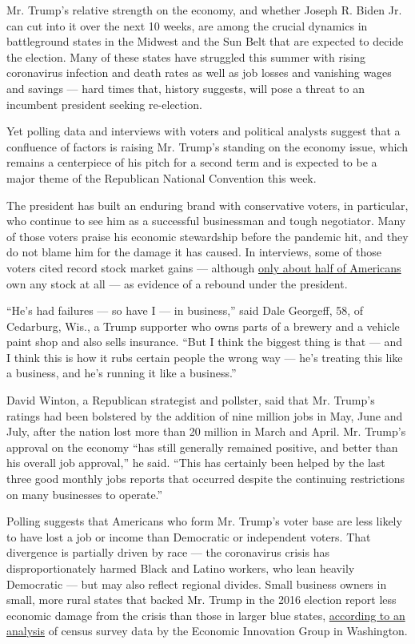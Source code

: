 Mr. Trump's relative strength on the economy, and whether Joseph R.
Biden Jr. can cut into it over the next 10 weeks, are among the crucial
dynamics in battleground states in the Midwest and the Sun Belt that are
expected to decide the election. Many of these states have struggled
this summer with rising coronavirus infection and death rates as well as
job losses and vanishing wages and savings --- hard times that, history
suggests, will pose a threat to an incumbent president seeking
re-election.

Yet polling data and interviews with voters and political analysts
suggest that a confluence of factors is raising Mr. Trump's standing on
the economy issue, which remains a centerpiece of his pitch for a second
term and is expected to be a major theme of the Republican National
Convention this week.

The president has built an enduring brand with conservative voters, in
particular, who continue to see him as a successful businessman and
tough negotiator. Many of those voters praise his economic stewardship
before the pandemic hit, and they do not blame him for the damage it has
caused. In interviews, some of those voters cited record stock market
gains --- although \href{https://www.nber.org/papers/w24085}{only about
half of Americans} own any stock at all --- as evidence of a rebound
under the president.

``He's had failures --- so have I --- in business,'' said Dale Georgeff,
58, of Cedarburg, Wis., a Trump supporter who owns parts of a brewery
and a vehicle paint shop and also sells insurance. ``But I think the
biggest thing is that --- and I think this is how it rubs certain people
the wrong way --- he's treating this like a business, and he's running
it like a business.''

David Winton, a Republican strategist and pollster, said that Mr.
Trump's ratings had been bolstered by the addition of nine million jobs
in May, June and July, after the nation lost more than 20 million in
March and April. Mr. Trump's approval on the economy ``has still
generally remained positive, and better than his overall job approval,''
he said. ``This has certainly been helped by the last three good monthly
jobs reports that occurred despite the continuing restrictions on many
businesses to operate.''

Polling suggests that Americans who form Mr. Trump's voter base are less
likely to have lost a job or income than Democratic or independent
voters. That divergence is partially driven by race --- the coronavirus
crisis has disproportionately harmed Black and Latino workers, who lean
heavily Democratic --- but may also reflect regional divides. Small
business owners in small, more rural states that backed Mr. Trump in the
2016 election report less economic damage from the crisis than those in
larger blue states,
\href{https://eig.org/news/taking-the-pulse-of-americas-small-business-sector}{according
to an analysis} of census survey data by the Economic Innovation Group
in Washington.

